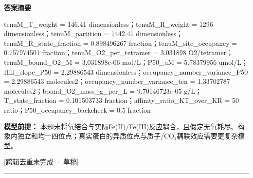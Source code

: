 \documentclass[UTF8,11pt,a4paper]{ctexart}
\begin{document}
\noindent\textbf{答案摘要}\par
tenuM\_T\_weight = 146.41 dimensionless；tenuM\_R\_weight = 1296 dimensionless；tenuM\_partition = 1442.41 dimensionless；tenuM\_R\_state\_fraction = 0.898496267 fraction；tenuM\_site\_occupancy = 0.757974501 fraction；tenuM\_O2\_per\_tetramer = 3.031898 O2/tetramer；tenuM\_bound\_O2\_M = 3.031898e-06 mol/L；P50\_uM = 5.78379956 umol/L；Hill\_slope\_P50 = 2.29886543 dimensionless；occupancy\_number\_variance\_P50 = 2.29886543 molecules2；occupancy\_number\_variance\_ten = 1.33702787 molecules2；bound\_O2\_mass\_g\_per\_L = 9.70146723e-05 g/L；T\_state\_fraction = 0.101503733 fraction；affinity\_ratio\_KT\_over\_KR = 50 ratio；P50\_occupancy\_backcheck = 0.5 fraction\par
\noindent\textbf{模型前提：}
本题未将氧结合与实际Fe(II)/Fe(III)反应耦合，且假定无氧耗尽、构象内独立和均一四位点；真实蛋白的异质位点与质子/CO₂耦联效应需要更复杂模型。\par
\noindent\textcolor{red!65!black}{[跨辑去重未完成 · 草稿]} \par
\medskip\hrule\medskip
{}
\end{document}
